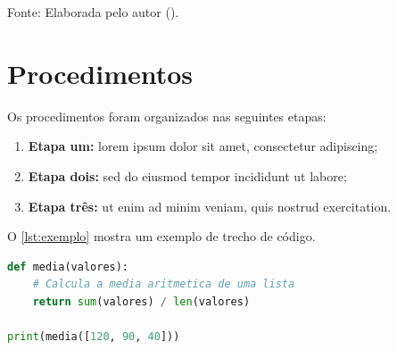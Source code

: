 \begin{table}[!htb]
  \centering
  {Fonte: Elaborada pelo autor (\the\year{}).}
\end{table}

\section{Procedimentos}
\label{sec:procedimentos}

Os procedimentos foram organizados nas seguintes etapas:

\begin{enumerate}[label=\arabic*.]
  \item \textbf{Etapa um:} lorem ipsum dolor sit amet, consectetur adipiscing;
  \item \textbf{Etapa dois:} sed do eiusmod tempor incididunt ut labore;
  \item \textbf{Etapa três:} ut enim ad minim veniam, quis nostrud exercitation.
\end{enumerate}

O \autoref{lst:exemplo} mostra um exemplo de trecho de código.

\begin{lstlisting}[language=Python, caption={Exemplo de código.}, label={lst:exemplo}]
def media(valores):
    # Calcula a media aritmetica de uma lista
    return sum(valores) / len(valores)

print(media([120, 90, 40]))
\end{lstlisting}

